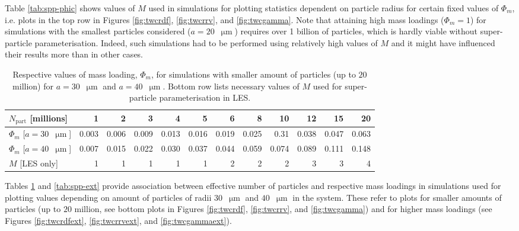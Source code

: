 \documentclass{pracamgren}
\begin{document}
Table \ref{tab:spp-phic} shows values of $M$ used in simulations for plotting statistics dependent on particle radius for certain fixed values of $\Phi_m$, i.e. plots in the top row in Figures \ref{fig:twcrdf}, \ref{fig:twcrrv}, and \ref{fig:twcgamma}.
Note that attaining high mass loadings ($\Phi_m = 1$) for simulations with the smallest particles considered ($a = 20$~$\upmu\text{m}$) requires over 1 billion of particles, which is hardly viable without super-particle parameterisation.
Indeed, such simulations had to be performed using relatively high values of $M$ and it might have influenced their results more than in other cases.

\begin{table}[ht]
\centering
\scriptsize
\begin{tabular}{lrrrrrrrrrrr}
$N_{\text{part}}$ [millions] & 1 & 2 & 3 & 4 & 5 & 6 & 8 & 10 & 12 & 15 & 20 \\ \hline
$\Phi_m$ [$a = 30$~$\upmu\text{m}$] & 0.003 & 0.006 & 0.009 & 0.013 & 0.016 & 0.019 & 0.025 & 0.31 & 0.038 & 0.047 & 0.063 \\
$\Phi_m$ [$a = 40$~$\upmu\text{m}$] & 0.007 & 0.015 & 0.022 & 0.030 & 0.037 & 0.044 & 0.059 & 0.074 & 0.089 & 0.111 & 0.148 \\
$M$ [LES only] & 1 & 1 & 1 & 1 & 1 & 2 & 2 & 2 & 3 & 3 & 4 \\
\end{tabular}
\caption{Respective values of mass loading, $\Phi_m$, for simulations with smaller amount of particles (up to $20$ million) for ${a = 30}$~$\upmu\text{m}$ and ${a = 40}$~$\upmu\text{m}$.
Bottom row lists necessary values of $M$ used for super-particle parameterisation in LES.
}
\label{tab:spp-base}
\end{table}

Tables \ref{tab:spp-base} and \ref{tab:spp-ext} provide association between effective number of particles and respective mass loadings in simulations used for plotting values depending on amount of particles of radii $30$~$\upmu\text{m}$ and $40$~$\upmu\text{m}$ in the system.
These refer to plots for smaller amounts of particles (up to $20$ million, see bottom plots in Figures \ref{fig:twcrdf}, \ref{fig:twcrrv}, and \ref{fig:twcgamma}) and for higher mass loadings (see Figures \ref{fig:twcrdfext}, \ref{fig:twcrrvext}, and \ref{fig:twcgammaext}).
\end{document}
